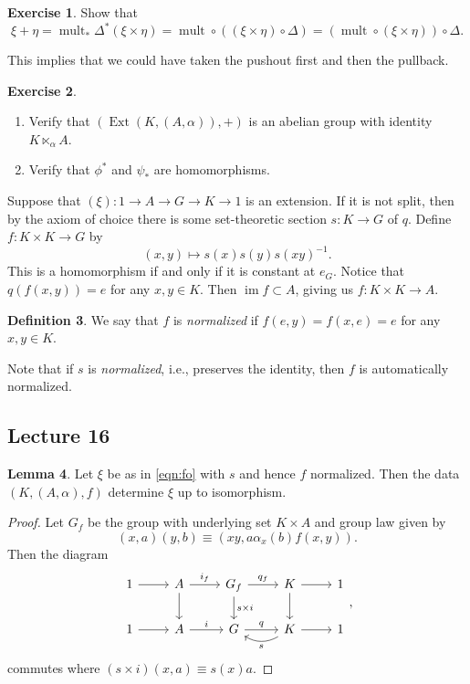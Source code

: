 \documentclass[10pt,letterpaper,cm]{nupset}
\theoremstyle{definition}
\newtheorem{definition}{Definition}[subsection]
\theoremstyle{theorem}
\newtheorem{lemma}[definition]{Lemma}
\newtheorem{exercise}[definition]{Exercise}
\theoremstyle{remark}
\newcommand{\1}{\mathbf{1}}
\newcommand{\0}{\vec 0}
\DeclareMathOperator{\mult}{mult}
\DeclareMathOperator{\ext}{Ext}
\DeclareMathOperator{\im}{im}
\begin{document}
\begin{exercise}
Show that $$\xi + \eta = \mult_{\ast} \Delta^{\ast}(\xi \times \eta) = \mult \circ \left(\left(\xi \times \eta\right)\circ \Delta\right) = \left(\mult \circ (\xi \times \eta)\right)\circ \Delta.$$ 
\end{exercise}

This implies that we could have taken the pushout first and then the pullback.

\begin{exercise} $ $
\begin{enumerate}
\item Verify that $\left(\ext(K, (A, \alpha)), +\right)$ is an abelian group with identity $K \ltimes_{\alpha} A$. 
\item Verify that $\phi^{\ast}$ and $\psi_{\ast}$ are homomorphisms.  
\end{enumerate}
\end{exercise}

\medskip

Suppose that $(\xi) : 1\to A \to G \to K \to 1$ is an extension. If it is not split, then by the axiom of choice there is some set-theoretic section $s: K \to G$ of $q$.
Define $f : K \times K\to G$ by $$(x, y) \mapsto s(x)s(y)s(xy)^{-1}.$$ This is a homomorphism if and only if it is constant at $e_G$. Notice that $q(f(x,y)) = e$ for any $x,y\in K$. Then $\im{f} \subset A$, giving us  $f: K\times K \to A$.
\begin{definition}
We say that $f$ is \textit{normalized} if $f(e, y) = f(x, e) =e$ for any $x,y \in K$.
\end{definition}
Note that if $s$ is \textit{normalized}, i.e., preserves the identity, then $f$ is automatically normalized.


\subsection{Lecture 16}

\begin{lemma} 
Let $\xi$ be as in \eqref{eqn:fo} with $s$ and hence $f$ normalized. Then the data $\left(K, (A, \alpha), f\right)$ determine $\xi$ up to isomorphism.
\end{lemma}
\begin{proof}
Let $G_f$ be the group with underlying set $K \times A$ and group law given by $$(x, a)(y, b) \equiv (xy, a \alpha_x(b)f(x,y)).$$ Then the diagram
\[
\begin{tikzcd}
1 \arrow[r] & A \arrow[r, "i_f"] \arrow[d] & G_f \arrow[d, "s\times i"] \arrow[r, "q_f"] & K \arrow[r] \arrow[d] & 1 \\
1 \arrow[r] & A \arrow[r, "i"] & G \arrow[r, "q"] & K \arrow[r] \arrow[l, "s", bend left] & 1
\end{tikzcd},
\]
commutes where $(s\times i)(x, a) \equiv s(x)a$.
\end{proof}
\end{document}
